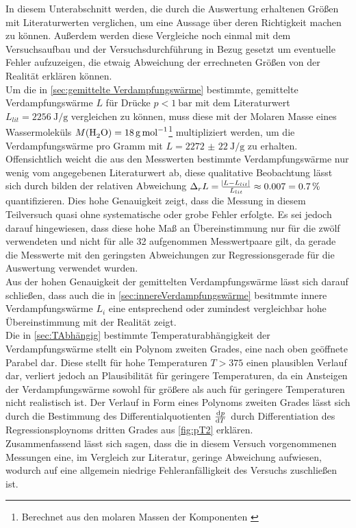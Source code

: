 In diesem Unterabschnitt werden, die durch die Auswertung erhaltenen
Größen mit Literaturwerten verglichen, um eine Aussage über deren 
Richtigkeit machen zu können. Außerdem werden diese Vergleiche noch
einmal mit dem Versuchsaufbau und der Versuchsdurchführung in Bezug
gesetzt um eventuelle Fehler aufzuzeigen, die etwaig Abweichung der 
errechneten Größen von der Realität erklären können.\\

Um die in \autoref{sec:gemittelte Verdampfungswärme} 
bestimmte, gemittelte Verdampfungswärme $L$ für Drücke 
$p < \SI{1}{\bar}$ mit dem Literaturwert $L_{lit} = 
\SI{2256}{\joule\per\g}$ \cite{Mende09}
vergleichen zu können, muss diese mit der 
Molaren Masse eines Wassermoleküls 
$M(\ce{H2O}) = \SI{18}{\g\per\mole}$\footnote{Berechnet aus den molaren Massen der Komponenten \cite{Kuchling07}} multipliziert werden, um die Verdampfungswärme pro Gramm mit 
$L =\SI{2272(22)}{\joule\per\g} $ zu erhalten.
Offensichtlich weicht die aus den Messwerten bestimmte Verdampfungswärme nur wenig vom angegebenen Literaturwert ab, diese qualitative Beobachtung lässt sich durch bilden der 
relativen Abweichung 
$ \Delta_{r} L = \tfrac{\envert{L - L_{lit}}}{L_{lit}} \approx 
\num{0.007} = \SI{0.7}{\percent}$ quantifizieren.
Dies hohe Genauigkeit zeigt, dass die Messung in diesem Teilversuch quasi
ohne systematische oder grobe Fehler erfolgte. Es sei jedoch darauf hingewiesen, dass
diese hohe Maß an Übereinstimmung nur für die zwölf verwendeten und nicht für alle 32 
aufgenommen Messwertpaare gilt, da gerade die Messwerte mit den geringsten Abweichungen 
zur Regressionsgerade für die Auswertung verwendet wurden.\\

Aus der hohen Genauigkeit der gemittelten Verdampfungswärme lässt sich darauf schließen,
dass auch die in \autoref{sec:innereVerdampfungswärme} besitmmte innere Verdampfungswärme
$L_{i}$ eine entsprechend oder zumindest vergleichbar hohe Übereinstimmung mit der Realität zeigt.\\

Die in \autoref{sec:TAbhängig} bestimmte Temperaturabhängigkeit der Verdampfungswärme
stellt ein Polynom zweiten Grades, eine nach oben geöffnete Parabel dar. 
Diese stellt für hohe Temperaturen $ T > 375 $ einen plausiblen Verlauf dar,
verliert jedoch an Plausibilität für geringere Temperaturen, da ein Ansteigen der
Verdampfungswärme sowohl für größere als auch für geringere Temperaturen nicht
realistisch ist.
Der Verlauf in Form eines Polynoms zweiten Grades lässt sich durch die Bestimmung
des Differentialquotienten $\tod{p}{T}$ durch Differentiation des Regressionsploynoms 
dritten Grades aus \autoref{fig:pT2} erklären.\\


Zusammenfassend lässt sich sagen, dass die in diesem Versuch vorgenommenen Messungen 
eine, im Vergleich zur Literatur, geringe Abweichung aufwiesen, wodurch auf eine allgemein niedrige Fehleranfälligkeit des Versuchs zuschließen ist. 